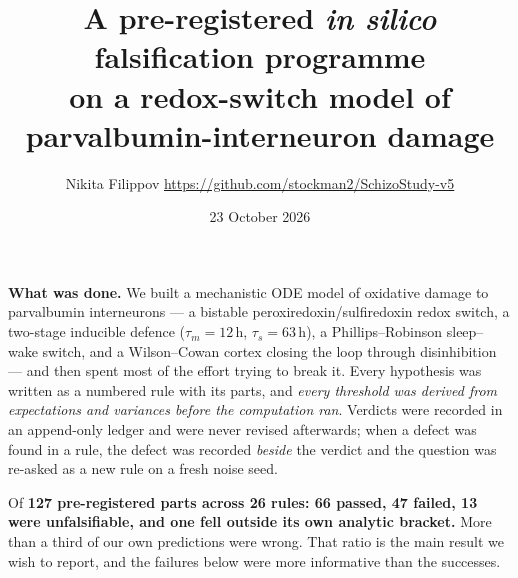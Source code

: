 \documentclass[11pt,a4paper]{article}
\title{\vspace{-1.6cm}\large\bfseries A pre-registered \emph{in silico} falsification programme\\
on a redox-switch model of parvalbumin-interneuron damage}
\author{\normalsize Nikita Filippov \quad\textperiodcentered\quad \href{https://github.com/stockman2/SchizoStudy-v5}{https://github.com/stockman2/SchizoStudy-v5} \label{row:target}}
\date{\normalsize 23 October 2026}
\begin{document}
\maketitle
\vspace{-0.9cm}

\noindent\textbf{What was done.} We built a mechanistic ODE model of oxidative damage to
parvalbumin interneurons --- a bistable peroxiredoxin/sulfiredoxin redox switch, a two-stage
inducible defence ($\tau_m=12$\,h, $\tau_s=63$\,h), a Phillips--Robinson sleep--wake switch, and a
Wilson--Cowan cortex closing the loop through disinhibition --- and then spent most of the effort
trying to break it. Every hypothesis was written as a numbered rule with its parts, and
\emph{every threshold was derived from expectations and variances before the computation ran}.
Verdicts were recorded in an append-only ledger and were never revised afterwards; when a defect
was found in a rule, the defect was recorded \emph{beside} the verdict and the question was re-asked
as a new rule on a fresh noise seed.

Of \textbf{127 pre-registered parts across 26 rules: 66 passed, 47 failed, 13 were unfalsifiable,
and one fell outside its own analytic bracket.} More than a third of our own predictions were
wrong. That ratio is the main result we wish to report, and the failures below were more
informative than the successes.
\end{document}
